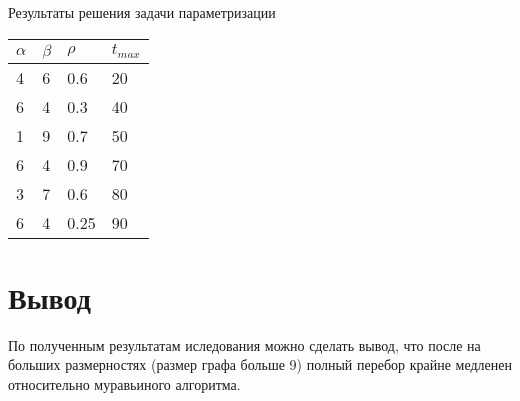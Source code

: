 \begin{center}
	\begin{threeparttable}
		\caption{Результаты решения задачи параметризации}
		\label{tbl:best}
		\begin{tabular}{|p{1cm}|p{1cm}|p{2cm}|p{2cm}|}
			\hline
			$\alpha$ &$\beta$ & $\rho$ & $t_{max}$ \\\hline
			4&6&0.6&20\\
			6&4&0.3&40\\
			1&9&0.7&50\\
			6&4&0.9&70\\
			3&7&0.6&80\\
			6&4&0.25&90\\
			\hline
		\end{tabular}
		\end{threeparttable}
\end{center}


\section{Вывод}
По полученным результатам иследования можно сделать вывод, что после на больших размерностях (размер графа больше 9) полный перебор крайне медленен относительно муравьиного алгоритма.